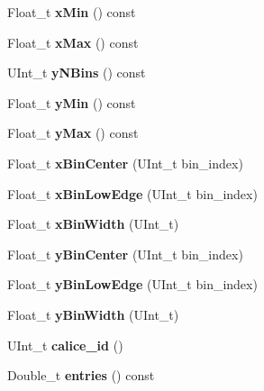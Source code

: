 \begin{DoxyCompactItemize}
\item 
Float\-\_\-t {\bfseries x\-Min} () const \label{classhistmgr_1_1Histogram2D_a9c5990884d2b038d94e56640e8f70a12}

\item 
Float\-\_\-t {\bfseries x\-Max} () const \label{classhistmgr_1_1Histogram2D_a96a6a6d6dff2e8fe03a368c462c88952}

\item 
U\-Int\-\_\-t {\bfseries y\-N\-Bins} () const \label{classhistmgr_1_1Histogram2D_a948a659fdd1a04946da319aacf809a75}

\item 
Float\-\_\-t {\bfseries y\-Min} () const \label{classhistmgr_1_1Histogram2D_acbe0f9156f69af35e7701796424efc57}

\item 
Float\-\_\-t {\bfseries y\-Max} () const \label{classhistmgr_1_1Histogram2D_a6e170388b9fe540e4553b2056691045d}

\item 
Float\-\_\-t {\bfseries x\-Bin\-Center} (U\-Int\-\_\-t bin\-\_\-index)\label{classhistmgr_1_1Histogram2D_a34240deb29b7af10792e82ab00a1ba96}

\item 
Float\-\_\-t {\bfseries x\-Bin\-Low\-Edge} (U\-Int\-\_\-t bin\-\_\-index)\label{classhistmgr_1_1Histogram2D_a86e526af29aa24c0a0486f84d800fecf}

\item 
Float\-\_\-t {\bfseries x\-Bin\-Width} (U\-Int\-\_\-t)\label{classhistmgr_1_1Histogram2D_ac8fd83fa10fc3468361e4d2e56d50442}

\item 
Float\-\_\-t {\bfseries y\-Bin\-Center} (U\-Int\-\_\-t bin\-\_\-index)\label{classhistmgr_1_1Histogram2D_afed2edc77e0353c1366dc555f49e22c0}

\item 
Float\-\_\-t {\bfseries y\-Bin\-Low\-Edge} (U\-Int\-\_\-t bin\-\_\-index)\label{classhistmgr_1_1Histogram2D_a3084d9ba1b47a865c36745fd19c7e7d3}

\item 
Float\-\_\-t {\bfseries y\-Bin\-Width} (U\-Int\-\_\-t)\label{classhistmgr_1_1Histogram2D_acc19b4a6e328acb6899de0c7504e2343}

\item 
U\-Int\-\_\-t {\bfseries calice\-\_\-id} ()\label{classhistmgr_1_1Histogram2D_aa6ea5c5bb5ff2b0fc7f6a8e9a5f3e625}

\item 
Double\-\_\-t {\bfseries entries} () const \label{classhistmgr_1_1Histogram2D_abb7d72e42edb6531399b10a91794382a}


\end{DoxyCompactItemize}
